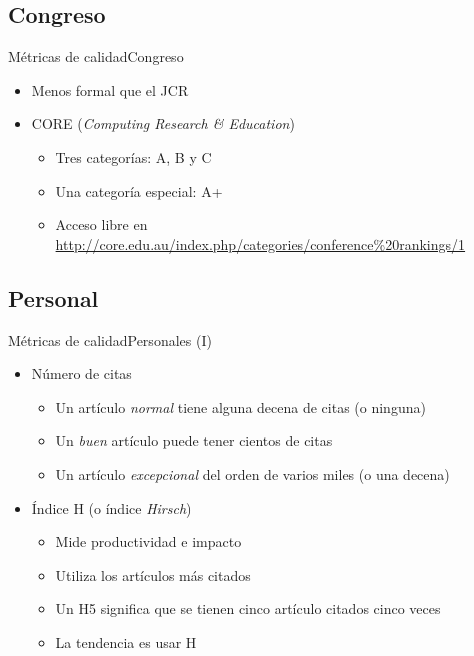 \documentclass{beamer}
\begin{document}
\subsection{Congreso}

\begin{frame}{Métricas de calidad}{Congreso}
  	\begin{itemize}
		\item Menos formal que el JCR
		\item CORE (\textit{Computing Research \& Education})
			\begin{itemize}
			\item Tres categorías: A, B y C
			\item Una categoría especial: A+
			\item Acceso libre en \url{http://core.edu.au/index.php/categories/conference\%20rankings/1}
			\end{itemize}
	\end{itemize}
\end{frame}

\subsection{Personal}

\begin{frame}{Métricas de calidad}{Personales (I)}
  	\begin{itemize}
		\item Número de citas
			\begin{itemize}
			\item Un artículo \textit{normal} tiene alguna decena de citas (o ninguna)
			\item Un \textit{buen} artículo puede tener cientos de citas
			\item Un artículo \textit{excepcional} del orden de varios miles (o una decena)
			\end{itemize}
		\item Índice H (o índice \textit{Hirsch})
			\begin{itemize}
			\item Mide productividad e impacto
			\item Utiliza los artículos más citados
			\item Un H5 significa que se tienen cinco artículo citados cinco veces
			\item La tendencia es usar H
			\end{itemize}
	\end{itemize}
\end{frame}
\end{document}
